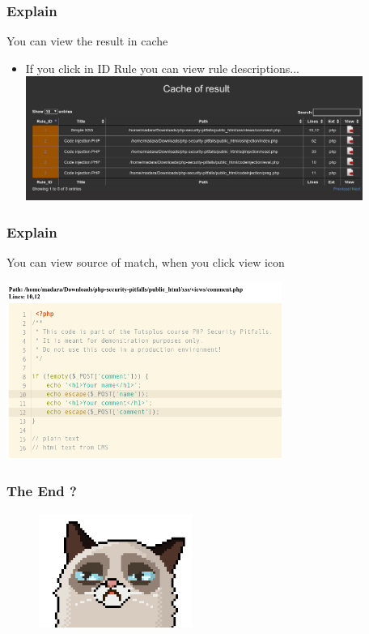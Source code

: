 \documentclass[serif,mathserif]{beamer}
\begin{document}
\begin{frame}
  \frametitle{Explain}
  You can view the result in cache
  \begin{itemize}
  \item If you click in ID Rule you can view rule descriptions...		  
  \includegraphics[width=11cm]{images/cache.png} 
  \end{itemize}
\end{frame}


\begin{frame}
  \frametitle{Explain}
  You can view source of match, when you click view icon
  \begin{itemize}	
  \includegraphics[width=9cm]{images/codeview.png} 
  \end{itemize}
\end{frame}


\begin{frame}
  \frametitle{The End ?}
  \begin{figure}[]    
    \centering
    \includegraphics[width=5cm]{images/codecat00.png} 
  \end{figure}
\end{frame}
\end{document}
